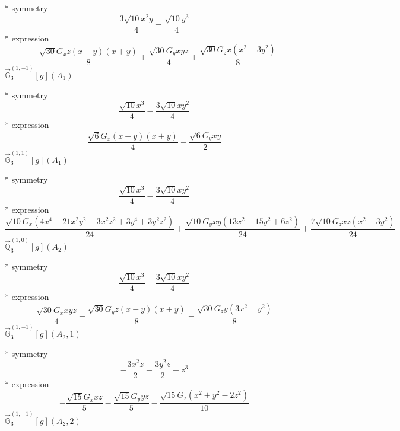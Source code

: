 \documentclass[fleqn,8pt]{jsarticle}
\begin{document}
\noindent\quad ** symmetry
\begin{dmath*}
\frac{3 \sqrt{10} x^{2} y}{4} - \frac{\sqrt{10} y^{3}}{4}
\end{dmath*}
\noindent\quad ** expression
\begin{dmath*}
- \frac{\sqrt{30} G_{x} z \left(x - y\right) \left(x + y\right)}{8} + \frac{\sqrt{30} G_{y} x y z}{4} + \frac{\sqrt{30} G_{z} x \left(x^{2} - 3 y^{2}\right)}{8}
\end{dmath*}
\noindent\quad $\vec{\mathbb{G}}_{3}^{(1,-1)}[g](A_{1})$

\noindent\quad ** symmetry
\begin{dmath*}
\frac{\sqrt{10} x^{3}}{4} - \frac{3 \sqrt{10} x y^{2}}{4}
\end{dmath*}
\noindent\quad ** expression
\begin{dmath*}
\frac{\sqrt{6} G_{x} \left(x - y\right) \left(x + y\right)}{4} - \frac{\sqrt{6} G_{y} x y}{2}
\end{dmath*}
\noindent\quad $\vec{\mathbb{G}}_{3}^{(1,1)}[g](A_{1})$

\noindent\quad ** symmetry
\begin{dmath*}
\frac{\sqrt{10} x^{3}}{4} - \frac{3 \sqrt{10} x y^{2}}{4}
\end{dmath*}
\noindent\quad ** expression
\begin{dmath*}
\frac{\sqrt{10} G_{x} \left(4 x^{4} - 21 x^{2} y^{2} - 3 x^{2} z^{2} + 3 y^{4} + 3 y^{2} z^{2}\right)}{24} + \frac{\sqrt{10} G_{y} x y \left(13 x^{2} - 15 y^{2} + 6 z^{2}\right)}{24} + \frac{7 \sqrt{10} G_{z} x z \left(x^{2} - 3 y^{2}\right)}{24}
\end{dmath*}
\noindent\quad $\vec{\mathbb{Q}}_{3}^{(1,0)}[g](A_{2})$

\noindent\quad ** symmetry
\begin{dmath*}
\frac{\sqrt{10} x^{3}}{4} - \frac{3 \sqrt{10} x y^{2}}{4}
\end{dmath*}
\noindent\quad ** expression
\begin{dmath*}
\frac{\sqrt{30} G_{x} x y z}{4} + \frac{\sqrt{30} G_{y} z \left(x - y\right) \left(x + y\right)}{8} - \frac{\sqrt{30} G_{z} y \left(3 x^{2} - y^{2}\right)}{8}
\end{dmath*}
\noindent\quad $\vec{\mathbb{G}}_{3}^{(1,-1)}[g](A_{2},1)$

\noindent\quad ** symmetry
\begin{dmath*}
- \frac{3 x^{2} z}{2} - \frac{3 y^{2} z}{2} + z^{3}
\end{dmath*}
\noindent\quad ** expression
\begin{dmath*}
- \frac{\sqrt{15} G_{x} x z}{5} - \frac{\sqrt{15} G_{y} y z}{5} - \frac{\sqrt{15} G_{z} \left(x^{2} + y^{2} - 2 z^{2}\right)}{10}
\end{dmath*}
\noindent\quad $\vec{\mathbb{G}}_{3}^{(1,-1)}[g](A_{2},2)$
\end{document}
